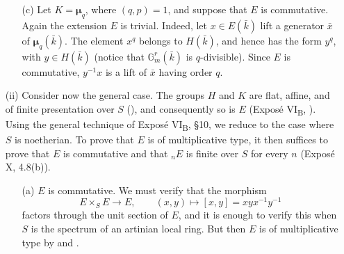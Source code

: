 \begin{enumerate}
\begin{enumerate}
  \item[\SGAInlineRefTarget{sga3:xvii:proposition:7:1:1:item:c}(c)] Let \(K=\boldsymbol\mu_q\), where \((q,p)=1\), and
    suppose that \(E\) is commutative.  Again the extension \(E\)
    is trivial.  Indeed, let \(x\in E(\bar k)\) lift a generator
    \(\bar x\) of \(\boldsymbol\mu_q(\bar k)\).  The element
    \(x^q\) belongs to \(H(\bar k)\), and hence has the form
    \(y^q\), with \(y\in H(\bar k)\) (notice that
    \(\mathbb G_m^r(\bar k)\) is \(q\)-divisible).  Since \(E\)
    is commutative, \(y^{-1}x\) is a lift of \(\bar x\) having
    order \(q\).
  \end{enumerate}

\item[(ii)] Consider now the general case.  The groups \(H\) and
  \(K\) are flat, affine, and of finite presentation over \(S\)
  (), and consequently so is \(E\) (Exposé
  VI\textsubscript{B}, ).  Using the general technique of
  Exposé VI\textsubscript{B}, \S10, we reduce to the case where
  \(S\) is noetherian.  To prove that \(E\) is of multiplicative
  type, it then suffices to prove that \(E\) is commutative and
  that \({}_nE\) is finite over \(S\) for every \(n\) (Exposé X,
  4.8(b)).

  \begin{enumerate}
  \item[(a)] \(E\) is commutative.  We must verify that the
    morphism
    \[
      E\times_S E\longrightarrow E,\qquad
      (x,y)\longmapsto[x,y]=xyx^{-1}y^{-1}
    \]
    factors through the unit section of \(E\), and it is enough
    to verify this when \(S\) is the spectrum of an artinian
    local ring.  But then \(E\) is of multiplicative type by 
    and .




\end{enumerate}
\end{enumerate}
